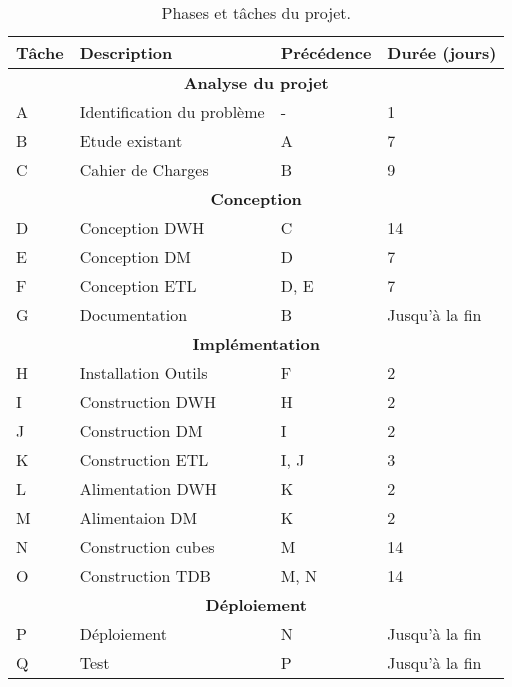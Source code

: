 \begin{table}[H]
    \centering
    \caption{Phases et tâches du projet.}
    \begin{tabular}[t]{|p{2cm}|p{7cm}|p{3cm}|p{3cm}|}
        \hline
        \textbf{Tâche} & \textbf{Description} & \textbf{Précédence} & \textbf{Durée (jours)} \\
        \hline\hline
        \multicolumn{4}{|c|}{\textbf{Analyse du projet}} \\
        \hline
        A & Identification du problème & - & 1 \\
        \hline
        B & Etude existant & A & 7 \\
        \hline
        C & Cahier de Charges & B & 9 \\
        \hline
        \multicolumn{4}{|c|}{\textbf{Conception}} \\
        \hline
        D & Conception DWH & C & 14 \\
        \hline
        E & Conception DM & D & 7 \\
        \hline
        F & Conception ETL & D, E & 7 \\
        \hline
        G & Documentation & B & Jusqu’à la fin \\
        \hline
        \multicolumn{4}{|c|}{\textbf{Implémentation
        }} \\
        \hline
        H & Installation Outils & F & 2 \\
        \hline
        I & Construction DWH & H & 2 \\
        \hline
        J & Construction DM & I & 2 \\
        \hline
        K & Construction ETL & I, J & 3 \\
        \hline
        L & Alimentation DWH & K & 2 \\
        \hline
        M & Alimentaion DM & K & 2 \\
        \hline
        N & Construction cubes & M & 14 \\
        \hline
        O & Construction TDB & M, N & 14 \\
        \hline
        \multicolumn{4}{|c|}{\textbf{Déploiement}} \\
        \hline
        P & Déploiement & N & Jusqu’à la fin \\
        \hline
        Q & Test & P & Jusqu’à la fin \\
        \hline\hline

    \end{tabular}
    \label{tab:gantt}
\end{table}%


